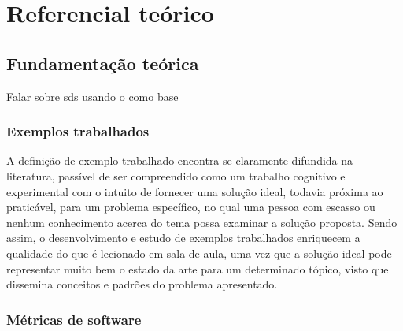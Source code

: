 \chapter{Referencial teórico}
\label{cap:referencialTeorico}


\section{Fundamentação teórica}
\label{section:background}
Falar sobre \gls{sds} usando o \cite{DistributedSystemsCoulouris} como base

\subsection{Exemplos trabalhados}

A definição de exemplo trabalhado encontra-se claramente difundida na literatura, passível de ser compreendido como um trabalho cognitivo e experimental com o intuito de fornecer uma solução ideal, todavia próxima ao praticável, para um problema específico, no qual uma pessoa com escasso ou nenhum conhecimento acerca do tema possa examinar a solução proposta. Sendo assim, o desenvolvimento e estudo de exemplos trabalhados enriquecem a qualidade do que é lecionado em sala de aula, uma vez que a solução ideal pode representar muito bem o estado da arte para um determinado tópico, visto que dissemina conceitos e padrões do problema apresentado\cite{Robert.Atkinson-etal:2000}.

\cite{Skudder-LuxtonReilly:2014}

\cite{Simone.Tonhao-etal:2021}
\cite{Simone.Tonhao-etal:2022}
\cite{Tiago.Bonetti-etal:2023}


\subsection{Métricas de software}

